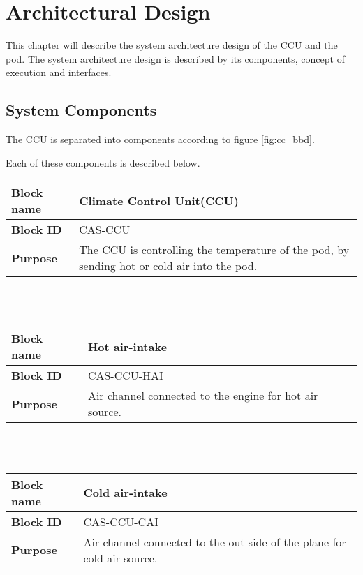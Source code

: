 
\thispagestyle{fancy}
\chapter{Architectural Design}
\label{chp:architectural}

This chapter will describe the system architecture design of the CCU and the pod.
The system architecture design is described by its components, concept of execution and interfaces.

\section{System Components}

The CCU is separated into components according to figure \ref{fig:cc_bbd}.


Each of these components is described below.\\

\begin{tabular}{|l|p{10cm}|}
    \hline
    \textbf{Block name}     & Climate Control Unit(CCU) \\
    \hline
    \textbf{Block ID}       & CAS-CCU \\
    \hline
    \textbf{Purpose}        & The CCU is controlling the temperature of the pod, by sending hot or cold air into the pod. \\
    \hline
\end{tabular}\\\\

\begin{tabular}{|l|p{10cm}|}
    \hline
    \textbf{Block name}     & Hot air-intake \\
    \hline
    \textbf{Block ID}       & CAS-CCU-HAI \\
    \hline
    \textbf{Purpose}        & Air channel connected to the engine for hot air source.  \\
    \hline
\end{tabular}\\\\

\begin{tabular}{|l|p{10cm}|}
    \hline
    \textbf{Block name}     & Cold air-intake \\
    \hline
    \textbf{Block ID}       & CAS-CCU-CAI \\
    \hline
    \textbf{Purpose}        & Air channel connected to the out side of the plane for cold air source. \\
    \hline
\end{tabular}\\\\

